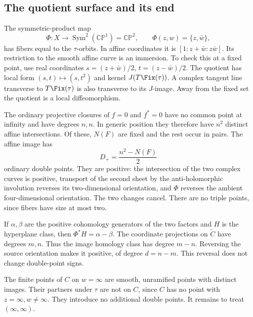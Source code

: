 \documentclass[UTF8,11pt]{ctexart}
\theoremstyle{definition}
\numberwithin{equation}{section}
\newcommand{\CP}{\mathbb {CP}}\newcommand{\cP}{\mathcal P}
\begin{document}
\subsection{The quotient surface and its end}\label{n:sec:surface}
The symmetric-product map
\[
 \Phi:X\longrightarrow\operatorname{Sym}^2(\CP^1)=\CP^2,
 \qquad \Phi(z,w)=\{z,\bar w\},
\]
has fibers equal to the $\tau$-orbits. In affine coordinates it is
$[1:z+\bar w:z\bar w]$. Its restriction to the smooth affine curve is an
immersion. To check this at a fixed point, use real coordinates
$s=(z+\bar w)/2$, $t=(z-\bar w)/2$. The quotient has local form
$(s,t)\mapsto(s,t^2)$ and kernel $J(T\Fix(\tau))$. A complex tangent line
transverse to $T\Fix(\tau)$ is also transverse to its $J$-image. Away from
the fixed set the quotient is a local diffeomorphism.

The ordinary projective closures of $f=0$ and $f^*=0$ have no common point
at infinity and have degrees $n,n$. In generic position they therefore
have $n^2$ distinct affine intersections. Of these, $N(F)$ are fixed and
the rest occur in pairs. The affine image has
\begin{equation}\label{n:eq:D}
 D_+=\frac{n^2-N(F)}2
\end{equation}
ordinary double points. They are positive: the intersection of the two
complex curves is positive, transport of the second sheet by the
anti-holomorphic involution reverses its two-dimensional orientation, and
$\Phi$ reverses the ambient four-dimensional orientation. The two changes
cancel. There are no triple points, since fibers have size at most two.

If $\alpha,\beta$ are the positive cohomology generators of the two factors
and $H$ is the hyperplane class, then $\Phi^*H=\alpha-\beta$. The coordinate
projections on $\widetilde C$ have degrees $m,n$. Thus the image homology
class has degree $m-n$. Reversing the source orientation makes it positive,
of degree $d=n-m$. This reversal does not change double-point signs.

The finite points of $C$ on $w=\infty$ are smooth, unramified points with
distinct images. Their partners under $\tau$ are not on $C$, since $C$
has no point with $z=\infty,w\ne\infty$. They introduce no additional
double points. It remains to treat $(\infty,\infty)$.
\end{document}
